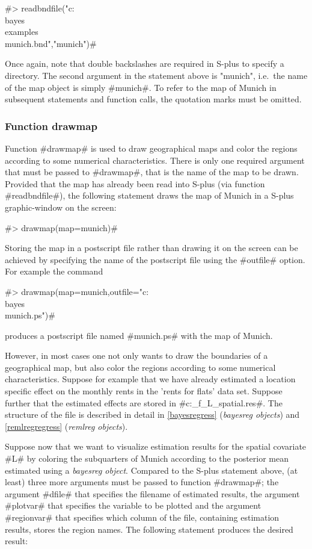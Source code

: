 #> readbndfile("c:\\bayes\\examples\\munich.bnd","munich")#

Once again, note that double backslashes are required in S-plus to
specify a directory. The second argument in the statement above is
"munich", i.e.~the name of the map object is simply #munich#. To
refer to the map of Munich in subsequent statements and function
calls, the quotation marks must be omitted.

\subsubsection*{Function drawmap}

Function #drawmap# is used to draw geographical maps and color the
regions according to some numerical characteristics. There is only
one required argument that must be passed to #drawmap#, that is
the name of the map to be drawn. Provided that the map has already
been read into S-plus (via function #readbndfile#), the following
statement draws the map of Munich in a S-plus graphic-window on
the screen:

#> drawmap(map=munich)#

Storing the map in a postscript file rather than drawing it on the
screen can be achieved by specifying the name of the postscript
file using the #outfile# option. For example the command

#> drawmap(map=munich,outfile="c:\\bayes\\munich.ps")#

produces a postscript file named #munich.ps# with the map of
Munich.

However, in most cases one not only wants to draw the boundaries of
a geographical map, but also color the regions according to some
numerical characteristics. Suppose for example that we have already
estimated a location specific effect on the monthly rents in the
'rents for flats' data set. Suppose further that the estimated
effects are stored in #c:\bayes\output\reg_f_L_spatial.res#. The
structure of the file is described in detail in
\autoref{bayesregress} ({\em bayesreg objects}) and
\autoref{remlregregress} ({\em remlreg objects}).

Suppose now that we want to visualize estimation results for the
spatial covariate #L# by coloring the subquarters of Munich
according to the posterior mean estimated using a {\em bayesreg
object}. Compared to the S-plus statement above, (at least) three
more arguments must be passed to function #drawmap#; the argument
#dfile# that specifies the filename of estimated results, the
argument #plotvar# that specifies the variable to be plotted and
the argument #regionvar# that specifies which column of the file,
containing estimation results, stores the region names. The
following statement produces the desired result:

